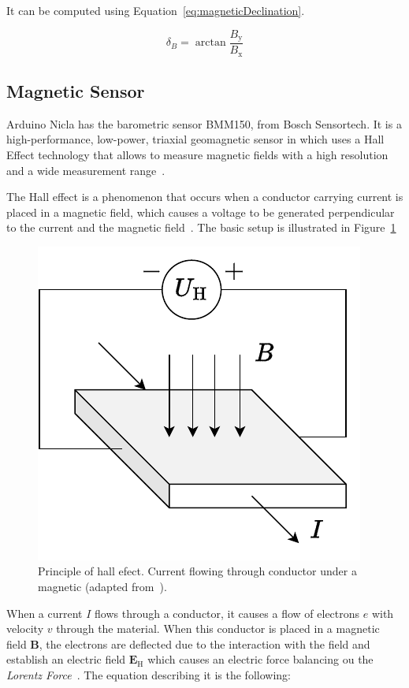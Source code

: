 \documentclass[DIV=14]{scrartcl}
\begin{document}
    It can be computed using Equation~\ref{eq:magneticDeclination}.

    \begin{equation}
        \delta_B = \arctan{\frac{B_{\mathrm{y}}}{B_{\mathrm{x}}}}
        \label{eq:magneticDeclination}
    \end{equation}

    \subsection{Magnetic Sensor}\label{subsec:magnetic-sensor}

    Arduino Nicla has the barometric sensor BMM150, from Bosch Sensortech.
    It is a high-performance, low-power, triaxial geomagnetic sensor in which uses
    a Hall Effect technology that allows to measure magnetic fields with a high resolution and a wide measurement range~\cite{BMM150}.

    The Hall effect is a phenomenon that occurs when a conductor carrying current
    is placed in a magnetic field, which causes a voltage to be generated perpendicular to the current and the magnetic field~\cite{labManual}.
    The basic setup is illustrated in Figure~\ref{fig:hallEffect}

    \begin{figure}[!h]
        \centering
        \includegraphics[width=.3\textwidth]{figures/HallEffect}
        \caption{Principle of hall efect. Current flowing through conductor under a magnetic (adapted from~\cite{labManual}).}
        \label{fig:hallEffect}
    \end{figure}

    When a current $I$ flows through a conductor, it causes a flow of electrons $e$ with velocity $v$ through the material.
    When this conductor is placed in a magnetic field $\boldsymbol{B}$, the electrons are deflected due to the interaction with the field
    and establish an electric field  $\boldsymbol{E_{\mathrm{H}}}$ which causes an electric force balancing ou the
    \textit{Lorentz Force}~\cite{labManual}.
    The equation describing it is the following:
\end{document}
